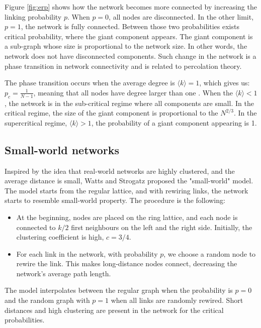 Figure \ref{fig:erp} shows how the network becomes more connected by increasing the linking probability $p$. When $p=0$, all nodes are disconnected. In the other limit, $p=1$, the network is fully connected. Between those two probabilities exists critical probability, where the giant component appears. The giant component is a sub-graph whose size is proportional to the network size. In other words, the network does not have disconnected components. Such change in the network is a phase transition in network connectivity and is related to percolation theory. 

The phase transition occurs when the average degree is $ \langle k  \rangle = 1$, which gives us: $p_c = \frac{1}{N-1}$, meaning that all nodes have degree larger than one \cite{barabasi2016network}. When the $ \langle k  \rangle < 1$, the network is in the sub-critical regime where all components are small. In the critical regime, the size of the giant component is proportional to the $N^{2/3}$. In the supercritical regime, $ \langle k  \rangle > 1$, the probability of a giant component appearing is 1.

\subsection{Small-world networks}

Inspired by the idea that real-world networks are highly clustered, and the average distance is small, Watts and Strogatz \cite{watts1998collective} proposed the "small-world" model. The model starts from the regular lattice, and with rewiring links, the network starts to resemble small-world property. The procedure is the following:

\begin{itemize}
	\item At the beginning, nodes are placed on the ring lattice, and each node is connected to $k/2$ first neighbours on the left and the right side. Initially, the clustering coefficient is high, $c=3/4$. 
	\item For each link in the network, with probability $p$, we choose a random node to rewire the link. This makes long-distance nodes connect, decreasing the network's average path length. 
\end{itemize}

The model interpolates between the regular graph when the probability is $p=0$ and the random graph with $p=1$ when all links are randomly rewired. Short distances and high clustering are present in the network for the critical probabilities. %

